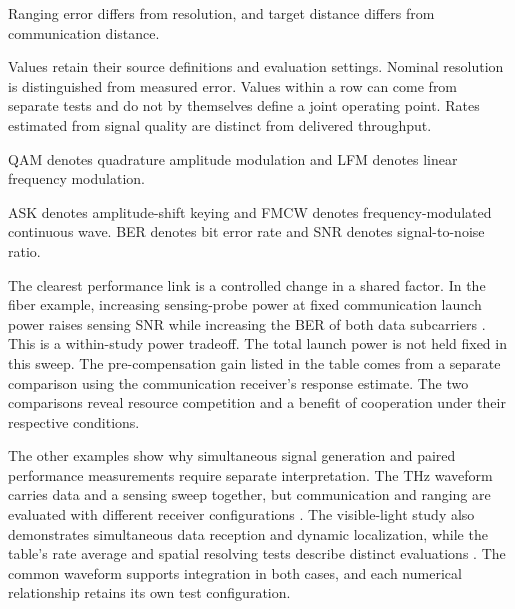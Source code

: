 \begin{table}[!t]
\begin{tabularx}{\textwidth}
Ranging error differs from resolution, and target distance differs
from communication distance. \\
\bottomrule
\end{tabularx}
\par\vspace{3pt}
\noindent\parbox{\textwidth}{\raggedright\footnotesize
Values retain their source definitions and evaluation settings. Nominal
resolution is distinguished from measured error. Values within a row can
come from separate tests and do not by themselves define a joint operating
point. Rates estimated from signal quality are distinct from delivered
throughput.\par
QAM denotes quadrature amplitude modulation and LFM denotes linear frequency
modulation.\par
ASK denotes amplitude-shift keying and FMCW denotes frequency-modulated
continuous wave. BER denotes bit error rate and SNR denotes signal-to-noise
ratio.\par}
\endgroup
\end{table}

The clearest performance link is a controlled change in a shared factor.
In the fiber example, increasing sensing-probe power at fixed communication
launch power raises sensing SNR while increasing the BER of both data
subcarriers \cite{OISAC_SCR00057}. This is a within-study power tradeoff.
The total launch power is not held fixed in this sweep.
The pre-compensation gain listed in the table comes from a separate comparison
using the communication receiver's response estimate.
The two comparisons reveal resource competition and a benefit of cooperation
under their respective conditions.

The other examples show why simultaneous signal generation and paired
performance measurements require separate interpretation. The THz waveform
carries data and a sensing sweep together, but communication and ranging
are evaluated with different receiver configurations \cite{OISAC_SCR00083}.
The visible-light study also demonstrates simultaneous data reception and
dynamic localization, while the table's rate average and spatial resolving
tests describe distinct evaluations \cite{OISAC_SCR00196}.
The common waveform supports integration in both cases, and each numerical
relationship retains its own test configuration.

